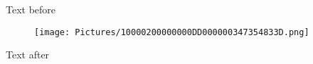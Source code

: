Text before

\begin{figure}
\centering
\texttt{[image: Pictures/10000200000000DD000000347354833D.png]}
\caption{}
\end{figure}

Text after 
